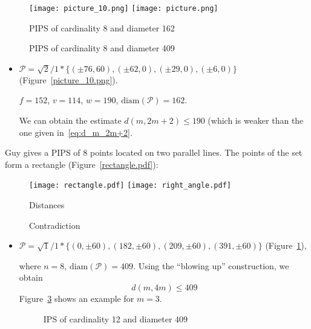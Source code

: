 \documentclass[12pt]{article}
\theoremstyle{theorem}
\theoremstyle{dfn}
\theoremstyle{remark}
\begin{document}
\begin{figure}[h!]
	\texttt{[image: picture\_10.png]}
	\hfill
	\texttt{[image: picture.png]}
	\\
	\parbox{.48\linewidth}{\caption{PIPS of cardinality 8 and diameter 162}
	\label{picture_10.png}}
	\hfill
	\parbox{.48\linewidth}{\caption{PIPS of cardinality 8 and diameter 409}
	\label{picture.png}}
\end{figure}


\begin{itemize}
\setlength{\itemsep}{-1mm}


\item
$\mathcal{P}=\sqrt{2}/{1} * \{ (\pm 76, 60),
(\pm 62 , 0),
(\pm 29 , 0),
(\pm 6 , 0)\}
$
(Figure~\ref{picture_10.png}).

$f = 152$, $v = 114$, $w = 190$, $\operatorname{diam(\mathcal{P})} = 162$.

We can obtain the estimate $d(m, 2m + 2) \leq 190$ (which
is weaker than the one given in~\eqref{eq:d_m_2m+2}.

\end{itemize}

Guy gives \cite[D 20]{guy2013unsolved} a PIPS of $8$ points located
on two parallel lines. The points of the set form a rectangle
(Figure~\ref{rectangle.pdf}):

\begin{figure}[htbp]
	\texttt{[image: rectangle.pdf]}
	\hfill
	\texttt{[image: right\_angle.pdf]}
	\\
	\parbox{.65\linewidth}{\caption{Distances}
	\label{rectangle.pdf}}
	\hfill
	\parbox{.5\linewidth}{\caption{Contradiction}
	\label{right_angle.pdf}}
\end{figure}

\begin{itemize}
\setlength{\itemsep}{-1mm}


\item
$\mathcal{P}=\sqrt{1}/{1} * \{ (0, \pm 60),
(182 , \pm 60),
(209 , \pm 60),
(391 , \pm 60)\}
$
(Figure~\ref{picture.png}),

where $n = 8$, $\operatorname{diam(\mathcal{P})} = 409$. Using the ``blowing up''
construction, we obtain
\begin{equation}\label{result1}
d(m, 4m) \leq 409
\end{equation}
Figure~\ref{picture_11.pdf} shows an example for $m = 3$.


\begin{figure}[h!]
\parbox{1\linewidth}{\caption{IPS of cardinality 12 and diameter 409}
\label{picture_11.pdf}}
\end{figure}


\end{itemize}
\end{document}
